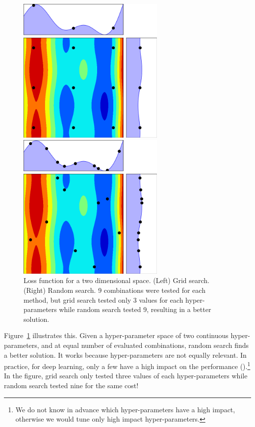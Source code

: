 \begin{figure}[htb]
	\begin{minipage}[b]{.49\linewidth}
		\centering
		\centerline{\includegraphics[width=7.2cm]{img_hyperopt/rs_grid}}
	\end{minipage}
	\begin{minipage}[b]{.49\linewidth}
		\centering
		\centerline{\includegraphics[width=7.2cm]{img_hyperopt/rs_random}}
	\end{minipage}
	\caption[Comparison of grid search and random search]{Loss function for a two dimensional space. (Left) Grid search. (Right) Random search. 9 combinations were tested for each method, but grid search tested only 3 values for each hyper-parameters while random search tested 9, resulting in a better solution.}
	\label{fig:rs}
\end{figure}

Figure~\ref{fig:rs} illustrates this. Given a hyper-parameter space of two continuous hyper-parameters, and at equal number of evaluated combinations, random search finds a better solution. It works because hyper-parameters are not equally relevant. In practice, for deep learning, only a few have a high impact on the performance (\textcite{bergstra2012JMLR}).\footnote{We do not know in advance which hyper-parameters have a high impact, otherwise we would tune only high impact hyper-parameters.} In the figure, grid search only tested three values of each hyper-parameters while random search tested nine for the same cost!

